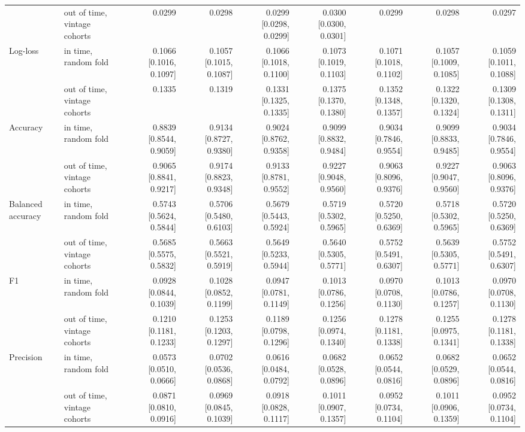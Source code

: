 \begin{tabular}{llrrrrrrr}
 & out of time, vintage cohorts & 0.0299 & 0.0298 & 0.0299 [0.0298, 0.0299] & 0.0300 [0.0300, 0.0301] & 0.0299 & 0.0298 & 0.0297 \\
\addlinespace
Log-loss & in time, random fold & 0.1066 [0.1016, 0.1097] & 0.1057 [0.1015, 0.1087] & 0.1066 [0.1018, 0.1100] & 0.1073 [0.1019, 0.1103] & 0.1071 [0.1018, 0.1102] & 0.1057 [0.1009, 0.1085] & 0.1059 [0.1011, 0.1088] \\
 & out of time, vintage cohorts & 0.1335 & 0.1319 & 0.1331 [0.1325, 0.1335] & 0.1375 [0.1370, 0.1380] & 0.1352 [0.1348, 0.1357] & 0.1322 [0.1320, 0.1324] & 0.1309 [0.1308, 0.1311] \\
\addlinespace
Accuracy & in time, random fold & 0.8839 [0.8544, 0.9059] & 0.9134 [0.8727, 0.9380] & 0.9024 [0.8762, 0.9358] & 0.9099 [0.8832, 0.9484] & 0.9034 [0.7846, 0.9554] & 0.9099 [0.8833, 0.9485] & 0.9034 [0.7846, 0.9554] \\
 & out of time, vintage cohorts & 0.9065 [0.8841, 0.9217] & 0.9174 [0.8823, 0.9348] & 0.9133 [0.8781, 0.9552] & 0.9227 [0.9048, 0.9560] & 0.9063 [0.8096, 0.9376] & 0.9227 [0.9047, 0.9560] & 0.9063 [0.8096, 0.9376] \\
\addlinespace
Balanced accuracy & in time, random fold & 0.5743 [0.5624, 0.5844] & 0.5706 [0.5480, 0.6103] & 0.5679 [0.5443, 0.5924] & 0.5719 [0.5302, 0.5965] & 0.5720 [0.5250, 0.6369] & 0.5718 [0.5302, 0.5965] & 0.5720 [0.5250, 0.6369] \\
 & out of time, vintage cohorts & 0.5685 [0.5575, 0.5832] & 0.5663 [0.5521, 0.5919] & 0.5649 [0.5233, 0.5944] & 0.5640 [0.5305, 0.5771] & 0.5752 [0.5491, 0.6307] & 0.5639 [0.5305, 0.5771] & 0.5752 [0.5491, 0.6307] \\
\addlinespace
F1 & in time, random fold & 0.0928 [0.0844, 0.1039] & 0.1028 [0.0852, 0.1199] & 0.0947 [0.0781, 0.1149] & 0.1013 [0.0786, 0.1256] & 0.0970 [0.0708, 0.1130] & 0.1013 [0.0786, 0.1257] & 0.0970 [0.0708, 0.1130] \\
 & out of time, vintage cohorts & 0.1210 [0.1181, 0.1233] & 0.1253 [0.1203, 0.1297] & 0.1189 [0.0798, 0.1296] & 0.1256 [0.0974, 0.1340] & 0.1278 [0.1181, 0.1338] & 0.1255 [0.0975, 0.1341] & 0.1278 [0.1181, 0.1338] \\
\addlinespace
Precision & in time, random fold & 0.0573 [0.0510, 0.0666] & 0.0702 [0.0536, 0.0868] & 0.0616 [0.0484, 0.0792] & 0.0682 [0.0528, 0.0896] & 0.0652 [0.0544, 0.0816] & 0.0682 [0.0529, 0.0896] & 0.0652 [0.0544, 0.0816] \\
 & out of time, vintage cohorts & 0.0871 [0.0810, 0.0916] & 0.0969 [0.0845, 0.1039] & 0.0918 [0.0828, 0.1117] & 0.1011 [0.0907, 0.1357] & 0.0952 [0.0734, 0.1104] & 0.1011 [0.0906, 0.1359] & 0.0952 [0.0734, 0.1104] \\

\end{tabular}
